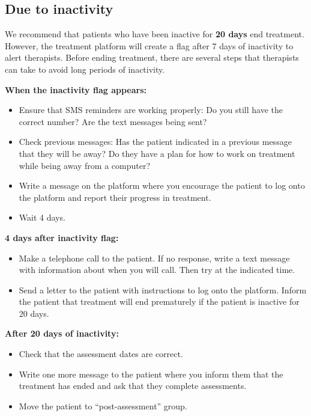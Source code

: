 \documentclass[]{book}
\providecommand{\tightlist}{%
  \setlength{\itemsep}{0pt}\setlength{\parskip}{0pt}}
\begin{document}
\hypertarget{due-to-inactivity}{%
\subsection{Due to inactivity}\label{due-to-inactivity}}

We recommend that patients who have been inactive for \textbf{20 days} end treatment. However, the treatment platform will create a flag after 7 days of inactivity to alert therapists. Before ending treatment, there are several steps that therapists can take to avoid long periods of inactivity.

\textbf{When the inactivity flag appears:}

\begin{itemize}
\tightlist
\item
  Ensure that SMS reminders are working properly: Do you still have the correct number? Are the text messages being sent?\\
\item
  Check previous messages: Has the patient indicated in a previous message that they will be away? Do they have a plan for how to work on treatment while being away from a computer?\\
\item
  Write a message on the platform where you encourage the patient to log onto the platform and report their progress in treatment.\\
\item
  Wait 4 days.
\end{itemize}

\textbf{4 days after inactivity flag:}

\begin{itemize}
\tightlist
\item
  Make a telephone call to the patient. If no response, write a text message with information about when you will call. Then try at the indicated time.\\
\item
  Send a letter to the patient with instructions to log onto the platform. Inform the patient that treatment will end prematurely if the patient is inactive for 20 days.
\end{itemize}

\textbf{After 20 days of inactivity:}

\begin{itemize}
\tightlist
\item
  Check that the assessment dates are correct.\\
\item
  Write one more message to the patient where you inform them that the treatment has ended and ask that they complete assessments.\\
\item
  Move the patient to ``post-assessment'' group.
\end{itemize}
\end{document}
